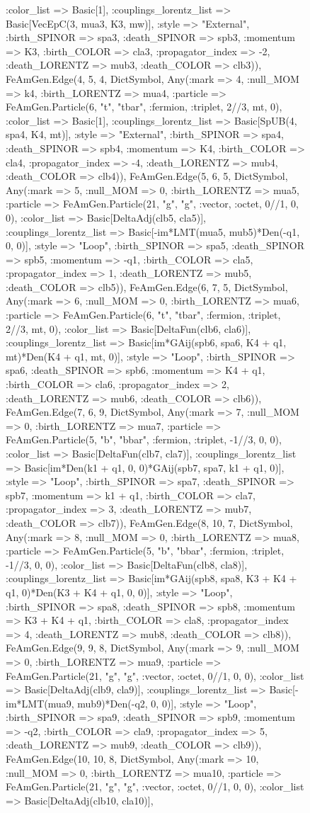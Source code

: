 \documentclass{revtex4}
\begin{document}
\begin{figure}[!htb]
\begin{center}
{:color_list => Basic[1], :couplings_lorentz_list => Basic[VecEpC(3, mua3, K3, mw)], :style => "External", :birth_SPINOR => spa3, :death_SPINOR => spb3, :momentum => K3, :birth_COLOR => cla3, :propagator_index => -2, :death_LORENTZ => mub3, :death_COLOR => clb3)), FeAmGen.Edge(4, 5, 4, Dict{Symbol, Any}(:mark => 4, :null_MOM => k4, :birth_LORENTZ => mua4, :particle => FeAmGen.Particle(6, "t", "tbar", :fermion, :triplet, 2//3, mt, 0), :color_list => Basic[1], :couplings_lorentz_list => Basic[SpUB(4, spa4, K4, mt)], :style => "External", :birth_SPINOR => spa4, :death_SPINOR => spb4, :momentum => K4, :birth_COLOR => cla4, :propagator_index => -4, :death_LORENTZ => mub4, :death_COLOR => clb4)), FeAmGen.Edge(5, 6, 5, Dict{Symbol, Any}(:mark => 5, :null_MOM => 0, :birth_LORENTZ => mua5, :particle => FeAmGen.Particle(21, "g", "g", :vector, :octet, 0//1, 0, 0), :color_list => Basic[DeltaAdj(clb5, cla5)], :couplings_lorentz_list => Basic[-im*LMT(mua5, mub5)*Den(-q1, 0, 0)], :style => "Loop", :birth_SPINOR => spa5, :death_SPINOR => spb5, :momentum => -q1, :birth_COLOR => cla5, :propagator_index => 1, :death_LORENTZ => mub5, :death_COLOR => clb5)), FeAmGen.Edge(6, 7, 5, Dict{Symbol, Any}(:mark => 6, :null_MOM => 0, :birth_LORENTZ => mua6, :particle => FeAmGen.Particle(6, "t", "tbar", :fermion, :triplet, 2//3, mt, 0), :color_list => Basic[DeltaFun(clb6, cla6)], :couplings_lorentz_list => Basic[im*GAij(spb6, spa6, K4 + q1, mt)*Den(K4 + q1, mt, 0)], :style => "Loop", :birth_SPINOR => spa6, :death_SPINOR => spb6, :momentum => K4 + q1, :birth_COLOR => cla6, :propagator_index => 2, :death_LORENTZ => mub6, :death_COLOR => clb6)), FeAmGen.Edge(7, 6, 9, Dict{Symbol, Any}(:mark => 7, :null_MOM => 0, :birth_LORENTZ => mua7, :particle => FeAmGen.Particle(5, "b", "bbar", :fermion, :triplet, -1//3, 0, 0), :color_list => Basic[DeltaFun(clb7, cla7)], :couplings_lorentz_list => Basic[im*Den(k1 + q1, 0, 0)*GAij(spb7, spa7, k1 + q1, 0)], :style => "Loop", :birth_SPINOR => spa7, :death_SPINOR => spb7, :momentum => k1 + q1, :birth_COLOR => cla7, :propagator_index => 3, :death_LORENTZ => mub7, :death_COLOR => clb7)), FeAmGen.Edge(8, 10, 7, Dict{Symbol, Any}(:mark => 8, :null_MOM => 0, :birth_LORENTZ => mua8, :particle => FeAmGen.Particle(5, "b", "bbar", :fermion, :triplet, -1//3, 0, 0), :color_list => Basic[DeltaFun(clb8, cla8)], :couplings_lorentz_list => Basic[im*GAij(spb8, spa8, K3 + K4 + q1, 0)*Den(K3 + K4 + q1, 0, 0)], :style => "Loop", :birth_SPINOR => spa8, :death_SPINOR => spb8, :momentum => K3 + K4 + q1, :birth_COLOR => cla8, :propagator_index => 4, :death_LORENTZ => mub8, :death_COLOR => clb8)), FeAmGen.Edge(9, 9, 8, Dict{Symbol, Any}(:mark => 9, :null_MOM => 0, :birth_LORENTZ => mua9, :particle => FeAmGen.Particle(21, "g", "g", :vector, :octet, 0//1, 0, 0), :color_list => Basic[DeltaAdj(clb9, cla9)], :couplings_lorentz_list => Basic[-im*LMT(mua9, mub9)*Den(-q2, 0, 0)], :style => "Loop", :birth_SPINOR => spa9, :death_SPINOR => spb9, :momentum => -q2, :birth_COLOR => cla9, :propagator_index => 5, :death_LORENTZ => mub9, :death_COLOR => clb9)), FeAmGen.Edge(10, 10, 8, Dict{Symbol, Any}(:mark => 10, :null_MOM => 0, :birth_LORENTZ => mua10, :particle => FeAmGen.Particle(21, "g", "g", :vector, :octet, 0//1, 0, 0), :color_list => Basic[DeltaAdj(clb10, cla10)], }
\end{center}
\end{figure}
\end{document}
